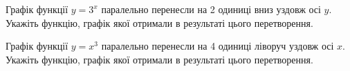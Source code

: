 \documentclass[12pt]{article}
\begin{document}
\begin{samepage}
\noindent\zadnum Графік функції $y=3^x$ паралельно перенесли на 2 одиниці вниз уздовж осі $y$. Укажіть функцію, графік якої отримали в результаті цього перетворення. 

\nmtnobreak
\nopagebreak\nbvspace{0.3cm}
\par{}
\end{samepage}

\begin{samepage}
\noindent\zadnum Графік функції $y=x^3$ паралельно перенесли на 4 одиниці ліворуч уздовж осі $x$. Укажіть функцію, графік якої отримали в результаті цього перетворення. 

\nmtnobreak
\nopagebreak\nbvspace{0.3cm}
\par{}
\end{samepage}
\end{document}
